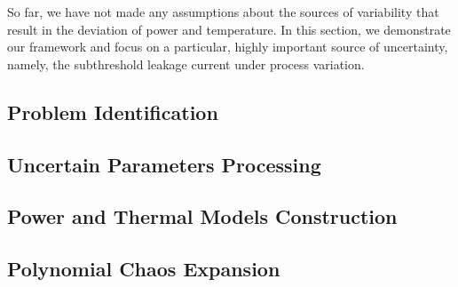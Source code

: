 So far, we have not made any assumptions about the sources of variability that result in the deviation of power and temperature. In this section, we demonstrate our framework and focus on a particular, highly important source of uncertainty, namely, the subthreshold leakage current under process variation.

\subsection{Problem Identification} 


\subsection{Uncertain Parameters Processing} 


\subsection{Power and Thermal Models Construction}  


\subsection{Polynomial Chaos Expansion} 

